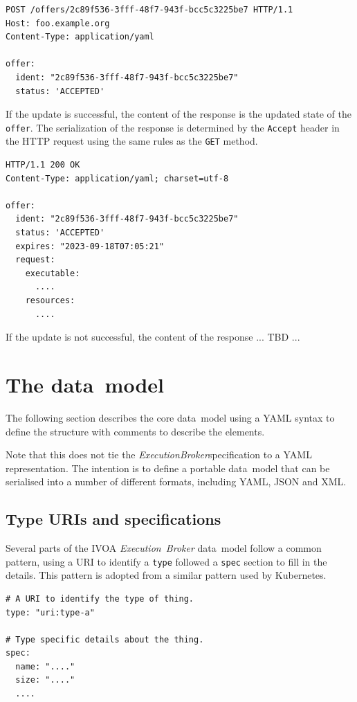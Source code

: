 \documentclass[11pt,a4paper]{ivoa}
\newcommand{\datamodel} {data~model}
\newcommand{\ivoa} {IVOA}
\newcommand{\execbrokerclass} {\textit{ExecutionBroker}}
\newcommand{\executionbroker} {\textit{Execution~Broker}}
\newcommand{\kubernetes} {Kubernetes}
\newcommand{\codeword}[1] {\texttt{#1}}
\begin{document}
\begin{lstlisting}[]
POST /offers/2c89f536-3fff-48f7-943f-bcc5c3225be7 HTTP/1.1
Host: foo.example.org
Content-Type: application/yaml

offer:
  ident: "2c89f536-3fff-48f7-943f-bcc5c3225be7"
  status: 'ACCEPTED'
\end{lstlisting}

If the update is successful, the content of the response is the updated state of the \codeword{offer}.
The serialization of the response is determined by the \codeword{Accept} header in the HTTP request
using the same rules as the \codeword{GET} method.

\begin{lstlisting}[]
HTTP/1.1 200 OK
Content-Type: application/yaml; charset=utf-8

offer:
  ident: "2c89f536-3fff-48f7-943f-bcc5c3225be7"
  status: 'ACCEPTED'
  expires: "2023-09-18T07:05:21"
  request:
    executable:
      ....
    resources:
      ....
\end{lstlisting}

If the update is not successful, the content of the response ... TBD ...


\pagebreak

\section{The \datamodel{}}
\label{datamodel}

The following section describes the core \datamodel{} using a YAML syntax
to define the structure with comments to describe the elements.

Note that this does not tie the \execbrokerclass specification to a YAML representation.
The intention is to define a portable \datamodel{} that can be serialised
into a number of different formats, including YAML, JSON and XML.

\subsection{Type URIs and specifications}
\label{type-and-spec}

Several parts of the \ivoa{} \executionbroker{} \datamodel{} follow a common pattern, using a URI
to identify a \codeword{type} followed a \codeword{spec} section to fill in the details.
This pattern is adopted from a similar pattern used by \kubernetes{}.

\begin{lstlisting}[]
# A URI to identify the type of thing.
type: "uri:type-a"

# Type specific details about the thing.
spec:
  name: "...."
  size: "...."
  ....
\end{lstlisting}
\end{document}
